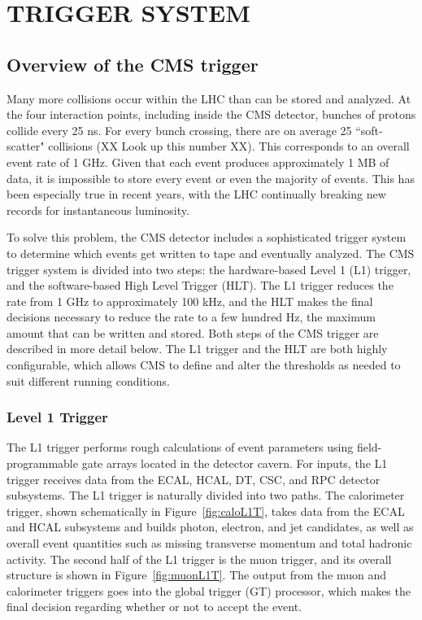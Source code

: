\chapter{TRIGGER SYSTEM}
\label{chap:Trigger}

\section{Overview of the CMS trigger}
\label{sec:trigOverview}
Many more collisions occur within the LHC than can be stored and analyzed. At the four interaction points, including inside the CMS detector, bunches of protons collide every 25 ns. For every bunch crossing, there are on average 25 ``soft-scatter" collisions (XX Look up this number XX). This corresponds to an overall event rate of 1 GHz. Given that each event produces approximately 1 MB of data, it is impossible to store every event or even the majority of events. This has been especially true in recent years, with the LHC continually breaking new records for instantaneous luminosity. 

To solve this problem, the CMS detector includes a sophisticated trigger system to determine which events get written to tape and eventually analyzed. The CMS trigger system is divided into two steps: the hardware-based Level 1 (L1) trigger, and the software-based High Level Trigger (HLT). The L1 trigger reduces the rate from 1 GHz to approximately 100 kHz, and the HLT makes the final decisions necessary to reduce the rate to a few hundred Hz, the maximum amount that can be written and stored. Both steps of the CMS trigger are described in more detail below. The L1 trigger and the HLT are both highly configurable, which allows CMS to define and alter the thresholds as needed to suit different running conditions.

\subsection{Level 1 Trigger}
\label{sec:L1}
The L1 trigger performs rough calculations of event parameters using field-programmable gate arrays located in the detector cavern. For inputs, the L1 trigger receives data from the ECAL, HCAL, DT, CSC, and RPC detector subsystems. The L1 trigger is naturally divided into two paths. The calorimeter trigger, shown schematically in Figure~\ref{fig:caloL1T}, takes data from the ECAL and HCAL subsystems and builds photon, electron, and jet candidates, as well as overall event quantities such as missing transverse momentum and total hadronic activity. The second half of the L1 trigger is the muon trigger, and its overall structure is shown in Figure~\ref{fig:muonL1T}. The output from the muon and calorimeter triggers goes into the global trigger (GT) processor, which makes the final decision regarding whether or not to accept the event. 

